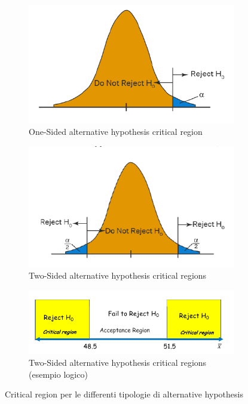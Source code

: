 \begin{figure}[h]
\centering
\begin{subfigure}[b]{0.4\textwidth}
\centering
\includegraphics[width=\textwidth]{img/chapter-4/one-sided-critical.png}
\caption{One-Sided alternative hypothesis critical region}
\end{subfigure}

\hfill

\begin{subfigure}[b]{0.4\textwidth}
\centering
\includegraphics[width=\textwidth]{img/chapter-4/two-sided-critical.png}
\caption{Two-Sided alternative hypothesis critical regions}
\end{subfigure}

\begin{subfigure}[b]{0.5\textwidth}
\centering
\includegraphics[width=\textwidth]{img/chapter-4/regioni critiche.png}
\caption{Two-Sided alternative hypothesis critical regions (esempio logico)}
\end{subfigure}

\caption{Critical region per le differenti tipologie di alternative hypothesis}\label{img:critical-regions}
\end{figure}

